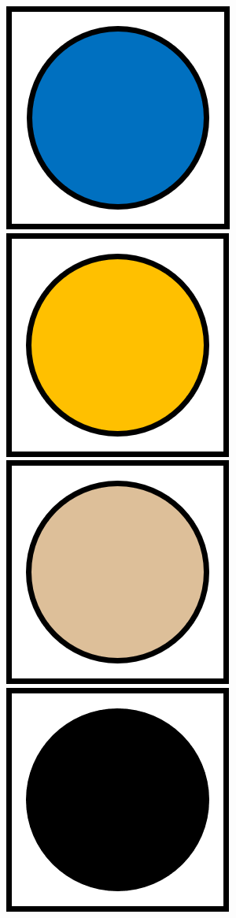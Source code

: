 \documentclass[../DocumentoOficial.tex]{subfiles}
\begin{document}
\begin{center}
\includegraphics[scale=0.65]{blueCube.png}
\includegraphics[scale=0.65]{orangeCube.png}
\includegraphics[scale=0.65]{beigeCube.png}
\includegraphics[scale=0.65]{blackCube.png}

\end{center}
\end{document}
